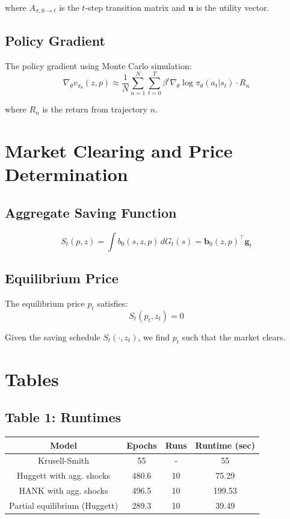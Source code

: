 \documentclass[12pt,a4paper]{article}
\begin{document}
where $A_{\pi,0\to t}$ is the $t$-step transition matrix and $\mathbf{u}$ is the utility vector.

\subsection{Policy Gradient}

The policy gradient using Monte Carlo simulation:
\begin{equation}
\nabla_\theta v_{\pi_\theta}(z, p) \approx \frac{1}{N} \sum_{n=1}^{N} \sum_{t=0}^{T} \beta^t \nabla_\theta \log \pi_\theta(a_t | s_t) \cdot R_n
\end{equation}

where $R_n$ is the return from trajectory $n$.

\section{Market Clearing and Price Determination}

\subsection{Aggregate Saving Function}
\begin{equation}
S_t(p, z) = \int b_0(s, z, p) \, dG_t(s) = \mathbf{b}_0(z, p)^\top \mathbf{g}_t
\end{equation}

\subsection{Equilibrium Price}
The equilibrium price $p_t$ satisfies:
\begin{equation}
S_t(p_t, z_t) = 0
\end{equation}

Given the saving schedule $S_t(\cdot, z_t)$, we find $p_t$ such that the market clears.

\section{Tables}

\subsection{Table 1: Runtimes}
\begin{tabular}{|c|c|c|c|}
\hline
Model & Epochs & Runs & Runtime (sec) \\
\hline
Krusell-Smith & 55 & - & 55 \\
\hline
Huggett with agg. shocks & 480.6 & 10 & 75.29 \\
\hline
HANK with agg. shocks & 496.5 & 10 & 199.53 \\
\hline
Partial equilibrium (Huggett) & 289.3 & 10 & 39.49 \\
\hline
\end{tabular}
\end{document}

